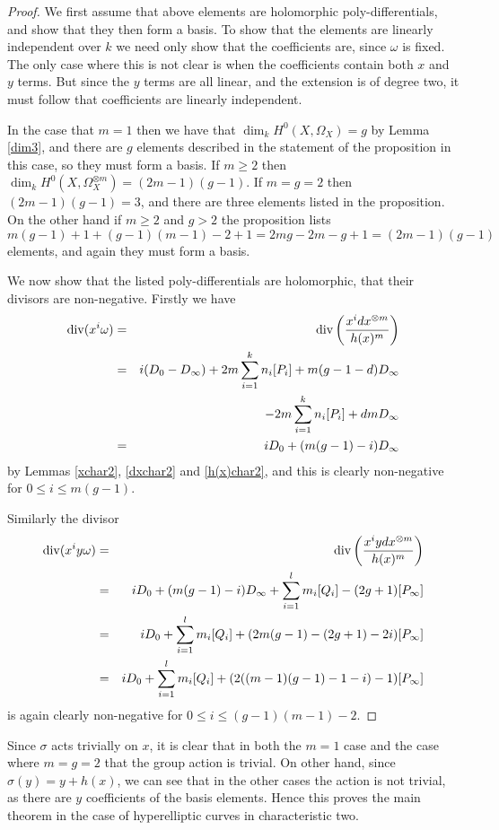 \begin{proof}
 We first assume that above elements are holomorphic poly-differentials, and show that they then form a basis.
To show that the elements are linearly independent over $k$ we need only show that the coefficients are, since $\omega$ is fixed.
The only case where this is not clear is when the coefficients contain both $x$ and $y$ terms.
But since the $y$ terms are all linear, and the extension is of degree two, it must follow that coefficients are linearly independent.
 
 
 In the case that $m=1$ then we have that $\dim_k H^0(X,\Omega_X) =g$ by Lemma \ref{dim3}, and there are $g$ elements described in the statement of the proposition in this case, so they must form a basis.
 If $m \geq 2$ then $\dim_k H^0(X,\Omega_X^{\otimes m}) = (2m-1)(g-1)$.
 If $m=g=2$ then $(2m-1)(g-1) = 3$, and there are three elements listed in the proposition.
 On the other hand if $m\geq 2$ and $g > 2$ the proposition lists
 \[
  m(g-1)+1 + (g-1)(m-1)-2+1 = 2mg -2m -g +1 = (2m-1)(g-1)
 \]
 elements, and again they must form a basis.
 
 We now show that the listed poly-differentials are holomorphic, \ie that their divisors are non-negative.
 Firstly we have
 \begin{eqnarray*}
  \operatorname{div}(x^i\omega) & = & \operatorname{div} \left( \frac{x^i dx^{\otimes m}}{h(x)^m} \right)\\ & = & i(D_0 - D_\infty) +2m\sum_{i=1}^k n_i[P_i] + m(g-1-d)D_\infty\\
  & & -2m\sum_{i=1}^k n_i [P_i] + dmD_\infty \\
  & = & iD_0 + (m(g-1) -i)D_\infty
 \end{eqnarray*}
  by Lemmas \ref{xchar2}, \ref{dxchar2} and \ref{h(x)char2}, and this is clearly non-negative for $0\leq i \leq m(g-1)$.
  
  Similarly the divisor 
  \begin{eqnarray*}
   \operatorname{div}(x^iy\omega) & = & \operatorname{div} \left( \frac{x^i ydx^{\otimes m}}{h(x)^m} \right)\\ & = & iD_0 + (m(g-1) -i)D_\infty + \sum_{i=1}^l m_i[Q_i] - (2g+1)[P_\infty] \\
    & = & iD_0 +  \sum_{i=1}^l m_i[Q_i] + (2m(g-1) -(2g+1) -2i)[P_\infty] \\
   & = & iD_0 +  \sum_{i=1}^l m_i[Q_i] + (2((m-1)(g-1) -1 -i)-1)[P_\infty]
  \end{eqnarray*}
 is again clearly non-negative for $0 \leq i \leq (g-1)(m-1)-2$.

  \end{proof}

  Since $\sigma$ acts trivially on $x$, it is clear that in both the $m=1$ case and the case where $m=g=2$ that the group action is trivial.
  On other hand, since $\sigma(y) = y+h(x)$, we can see that in the other cases the action is not trivial, as there are $y$ coefficients of the basis elements.
  Hence this proves the main theorem in the case of hyperelliptic curves in characteristic two.
  
  

